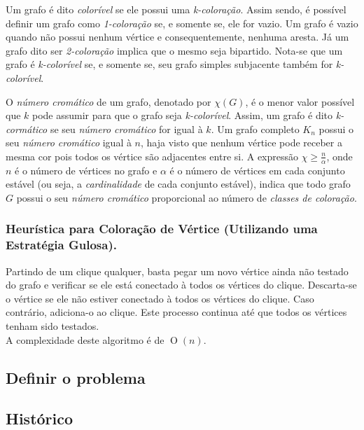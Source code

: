 \documentclass[12pt]{article}
\newcommand{\BigO}[1]{\ensuremath{\operatorname{O}\left(#1\right)}}
\begin{document}
Um grafo é dito \emph{colorível} se ele possui uma \emph{k-coloração}. Assim sendo, é possível definir um grafo como \emph{1-coloração} se, e somente se, ele for vazio. Um grafo é vazio quando não possui nenhum vértice e consequentemente, nenhuma aresta. Já um grafo dito ser \emph{2-coloração} implica que o mesmo seja bipartido. Nota-se que um grafo é \emph{k-colorível} se, e somente se, seu grafo simples subjacente também for \emph{k-colorível}.

O \emph{número cromático} de um grafo, denotado por $\chi(G)$, é o menor valor possível que $k$ pode assumir para que o grafo seja \emph{k-colorível}. Assim, um grafo é dito \emph{k-cormático} se seu \emph{número cromático} for igual à $k$. Um grafo completo $K_n$ possui o seu \emph{número cromático} igual à $n$, haja visto que nenhum vértice pode receber a mesma cor pois todos os vértice são adjacentes entre si. A expressão
$\chi \geq \frac{n}{\alpha}$, onde $n$ é o número de vértices no grafo e $\alpha$ é o número de vértices em cada conjunto estável (ou seja, a \emph{cardinalidade} de cada conjunto estável), indica que todo grafo $G$ possui o seu \emph{número cromático} proporcional ao número de \emph{classes de coloração}.

\subsubsection{Heurística para Coloração de Vértice (Utilizando uma Estratégia Gulosa).}

Partindo de um clique qualquer, basta pegar um novo vértice ainda não testado do grafo e verificar se ele está conectado à todos os vértices do clique. Descarta-se o vértice se ele não estiver conectado à todos os vértices do clique. Caso contrário, adiciona-o ao clique. Este processo continua até que todos os vértices tenham sido testados.\\

A complexidade deste algoritmo é de \BigO{n}.


\subsection{Definir o problema}

\subsection{Histórico}

\end{document}
